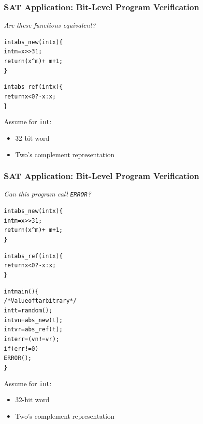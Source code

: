 \documentclass[t,pdf]{beamer}
\newenvironment{ccode}{\begin{alltt}\footnotesize}{\end{alltt}}
\begin{document}
\begin{frame}[fragile]
  \frametitle{SAT Application: Bit-Level Program Verification}
{\large \em  \textcolor{xblue}{Are these functions equivalent?}}\\
\medskip

\begin{minipage}[t]{0.48\textwidth}
\begin{ccode}
int abs_new(int x) \verb:{:
  int m = x>>31;
  return (x^m) + ~m + 1;
\verb:}:

int abs_ref(int x) \verb:{:
  return x < 0 ? -x : x;
\verb:}:    
\end{ccode}
\end{minipage}
\begin{minipage}[t]{0.48\textwidth}
\begin{ccode}
\end{ccode}
\end{minipage}

\medskip
Assume for {\tt int}:
  \begin{itemize}
  \item 32-bit word
  \item Two's complement representation
  \end{itemize}
\end{frame}

\begin{frame}[fragile]
  \frametitle{SAT Application: Bit-Level Program Verification}
{\large \em \textcolor{xblue}{Can this program call \texttt{ERROR}?}}\\

\medskip
\begin{minipage}[t]{0.48\textwidth}
\begin{ccode}
int abs_new(int x) \verb:{:
  int m = x>>31;
  return (x^m) + ~m + 1;
\verb:}:

int abs_ref(int x) \verb:{:
  return x < 0 ? -x : x;
\verb:}:    
\end{ccode}
\end{minipage}
\begin{minipage}[t]{0.48\textwidth}
\begin{ccode}
int main() \verb:{:
  /* Value of t arbitrary */
  int t = random();
  int vn = abs_new(t);
  int vr = abs_ref(t);
  int err = (vn != vr);
  if (err != 0)
    ERROR();
\verb:}:
\end{ccode}
\end{minipage}

Assume for {\tt int}:
  \begin{itemize}
  \item 32-bit word
  \item Two's complement representation
  \end{itemize}


\end{frame}
\end{document}
